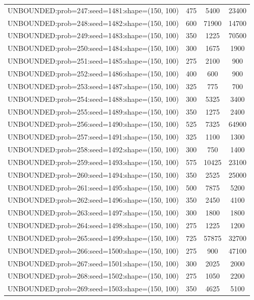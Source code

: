 \begin{longtable}{lccc}
UNBOUNDED:prob=247:seed=1481:shape=(150, 100) &      475 &  5400 &  23400 \\
UNBOUNDED:prob=248:seed=1482:shape=(150, 100) &      600 & 71900 &  14700 \\
UNBOUNDED:prob=249:seed=1483:shape=(150, 100) &      350 &  1225 &  70500 \\
UNBOUNDED:prob=250:seed=1484:shape=(150, 100) &      300 &  1675 &   1900 \\
UNBOUNDED:prob=251:seed=1485:shape=(150, 100) &      275 &  2100 &    900 \\
UNBOUNDED:prob=252:seed=1486:shape=(150, 100) &      400 &   600 &    900 \\
UNBOUNDED:prob=253:seed=1487:shape=(150, 100) &      325 &   775 &    700 \\
UNBOUNDED:prob=254:seed=1488:shape=(150, 100) &      300 &  5325 &   3400 \\
UNBOUNDED:prob=255:seed=1489:shape=(150, 100) &      350 &  1275 &   2400 \\
UNBOUNDED:prob=256:seed=1490:shape=(150, 100) &      525 &  7325 &  64900 \\
UNBOUNDED:prob=257:seed=1491:shape=(150, 100) &      325 &  1100 &   1300 \\
UNBOUNDED:prob=258:seed=1492:shape=(150, 100) &      300 &   750 &   1400 \\
UNBOUNDED:prob=259:seed=1493:shape=(150, 100) &      575 & 10425 &  23100 \\
UNBOUNDED:prob=260:seed=1494:shape=(150, 100) &      350 &  2525 &  25000 \\
UNBOUNDED:prob=261:seed=1495:shape=(150, 100) &      500 &  7875 &   5200 \\
UNBOUNDED:prob=262:seed=1496:shape=(150, 100) &      350 &  2450 &   4100 \\
UNBOUNDED:prob=263:seed=1497:shape=(150, 100) &      300 &  1800 &   1800 \\
UNBOUNDED:prob=264:seed=1498:shape=(150, 100) &      275 &  1225 &   1200 \\
UNBOUNDED:prob=265:seed=1499:shape=(150, 100) &      725 & 57875 &  32700 \\
UNBOUNDED:prob=266:seed=1500:shape=(150, 100) &      275 &   900 &  47100 \\
UNBOUNDED:prob=267:seed=1501:shape=(150, 100) &      300 &  2025 &   2000 \\
UNBOUNDED:prob=268:seed=1502:shape=(150, 100) &      275 &  1050 &   2200 \\
UNBOUNDED:prob=269:seed=1503:shape=(150, 100) &      350 &  4625 &   5100 \\

\end{longtable}
